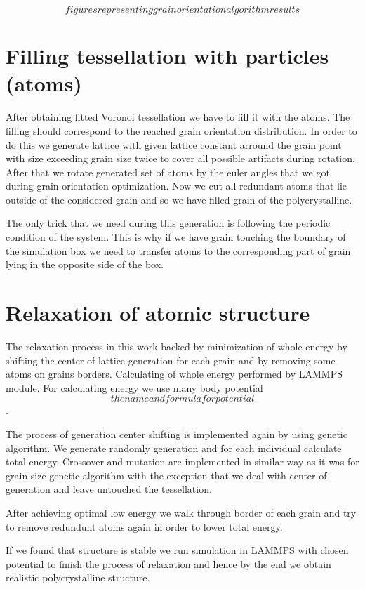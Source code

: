 \documentclass{article}
\begin{document}
\[figures representing grain orientation algorithm results\]

\section{Filling tessellation with particles (atoms)}

After obtaining fitted Voronoi tessellation we have to fill it with the atoms. The filling should correspond to the reached grain orientation distribution. In order to do this we generate lattice with given lattice constant arround the grain point with size exceeding grain size twice to cover all possible artifacts during rotation. After that we rotate generated set of atoms by the euler angles that we got during grain orientation optimization. Now we cut all redundant atoms that lie outside of the considered grain and so we have filled grain of the polycrystalline.

The only trick that we need during this generation is following the periodic condition of the system. This is why if we have grain touching the boundary of the simulation box we need to transfer atoms to the corresponding part of grain lying in the opposite side of the box.  

\section{Relaxation of atomic structure}

The relaxation process in this work backed by minimization of whole energy by shifting the center of lattice generation for each grain and by removing some atoms on grains borders. Calculating of whole energy performed by LAMMPS module. For calculating energy we use many body potential \[the name and formula for potential\].

The process of generation center shifting is implemented again by using genetic algorithm. We generate randomly generation and for each individual calculate total energy. Crossover and mutation are implemented in similar way as it was for grain size genetic algorithm with the exception that we deal with center of generation and leave untouched the tessellation.

After achieving optimal low energy we walk through border of each grain and try to remove redundunt atoms again in order to lower total energy.

If we found that structure is stable we run simulation in LAMMPS with chosen potential to finish the process of relaxation and hence by the end we obtain realistic polycrystalline structure.
\end{document}
